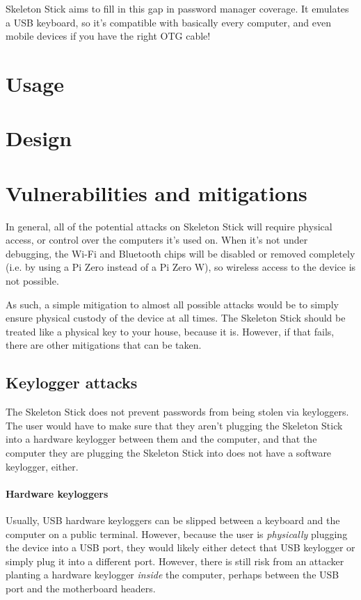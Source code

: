 \documentclass{article}
\begin{document}
Skeleton Stick aims to fill in this gap in password manager coverage. It emulates a USB keyboard, so it's compatible with basically every computer, and even mobile devices if you have the right OTG cable!

\section{Usage}

\section{Design}

\section{Vulnerabilities and mitigations}

In general, all of the potential attacks on Skeleton Stick will require physical access, or control over the computers it's used on. When it's not under debugging, the Wi-Fi and Bluetooth chips will be disabled or removed completely (i.e. by using a Pi Zero instead of a Pi Zero W), so wireless access to the device is not possible.

As such, a simple mitigation to almost all possible attacks would be to simply ensure physical custody of the device at all times. The Skeleton Stick should be treated like a physical key to your house, because it is. However, if that fails, there are other mitigations that can be taken.

\subsection{Keylogger attacks}

The Skeleton Stick does not prevent passwords from being stolen via keyloggers. The user would have to make sure that they aren't plugging the Skeleton Stick into a hardware keylogger between them and the computer, and that the computer they are plugging the Skeleton Stick into does not have a software keylogger, either.

\paragraph{Hardware keyloggers} Usually, USB hardware keyloggers can be slipped between a keyboard and the computer on a public terminal. However, because the user is \textit{physically} plugging the device into a USB port, they would likely either detect that USB keylogger or simply plug it into a different port. However, there is still risk from an attacker planting a hardware keylogger \textit{inside} the computer, perhaps between the USB port and the motherboard headers.
\end{document}
